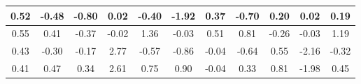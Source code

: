 \begin{tiny}\begin{tabular}{|c|c|c|c|c|c|c|c|c|c|c|}
\hline
0.52&-0.48&-0.80&0.02&-0.40&-1.92&0.37&-0.70&0.20&0.02&0.19\\\hline
0.55&0.41&-0.37&-0.02&1.36&-0.03&0.51&0.81&-0.26&-0.03&1.19\\\hline
0.43&-0.30&-0.17&2.77&-0.57&-0.86&-0.04&-0.64&0.55&-2.16&-0.32\\\hline
0.41&0.47&0.34&2.61&0.75&0.90&-0.04&0.33&0.81&-1.98&0.45\\\hline
\end{tabular}
\end{tiny}